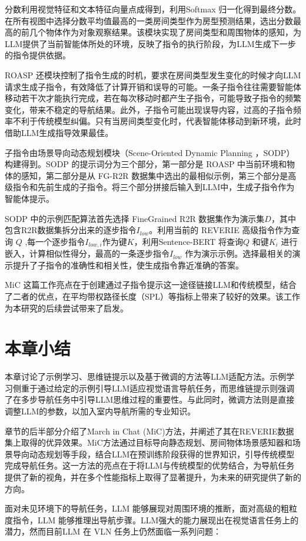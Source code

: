 \documentclass[bachelor]{thesis-uestc}
\begin{document}
分数利用视觉特征和文本特征向量点成得到，利用Softmax 归一化得到最终分数。在所有视图中选择分数平均值最高的一类房间类型作为房型预测结果，选出分数最高的前几个物体作为对象观察结果。该模块实现了房间类型和周围物体的感知，为LLM提供了当前智能体所处的环境，反映了指令的执行阶段，为LLM生成下一步的指令提供依据。

ROASP 还模块控制了指令生成的时机，要求在房间类型发生变化的时候才向LLM请求生成子指令，有效降低了计算开销和误导的可能。一条子指令往往需要智能体移动若干次才能执行完成，若在每次移动时都产生子指令，可能导致子指令的频繁变化，带来不稳定的导航结果。此外，子指令可能出现误导内容，过高的子指令频率不利于传统模型纠偏。只有当房间类型变化时，代表智能体移动到新环境，此时借助LLM生成指导效果最佳。

子指令由场景导向动态规划模块（Scene-Oriented Dynamic Planning ，SODP）构建得到。SODP 的提示词分为三个部分，第一部分是 ROASP 中当前环境和物体的感知，第二部分是从 FG-R2R 数据集中选出的最相似示例，第三个部分是高级指令和先前生成的子指令。将三个部分拼接后输入到LLM中，生成子指令作为智能体提示。

SODP 中的示例匹配算法首先选择 FineGrained R2R 数据集作为演示集$D$，其中包含R2R数据集拆分出来的逐步指令$I_{low}$。利用当前的 REVERIE 高级指令作为查询 $Q$ ,每一个逐步指令$I_{low,i}$作为键$K$，利用Sentence-BERT 将查询$Q$ 和键$K_i$ 进行嵌入，计算相似性得分，最高的一条逐步指令$I_{low}$ 作为演示示例。选择最相关的演示提升了子指令的准确性和相关性，使生成指令靠近准确的答案。

MiC 这篇工作亮点在于创建通过子指令提示这一途径链接LLM和传统模型，结合了二者的优点，在平均带权路径长度（SPL）等指标上带来了较好的效果。该工作为本研究的后续尝试带来了启发。

\section{本章小结}
本章讨论了示例学习、思维链提示以及基于微调的方法等LLM适配方法。示例学习侧重于通过给定的示例引导LLM适应视觉语言导航任务，而思维链提示则强调了在多步导航任务中引导LLM思维过程的重要性。与此同时，微调方法则是直接调整LLM的参数，以加入室内导航所需的专业知识。

章节的后半部分介绍了March in Chat (MiC)方法，并阐述了其在REVERIE数据集上取得的优异效果。MiC方法通过目标导向静态规划、房间物体场景感知器和场景导向动态规划等手段，结合LLM在预训练阶段获得的世界知识，引导传统模型完成导航任务。这一方法的亮点在于将LLM与传统模型的优势结合，为导航任务提供了新的视角，并在多个性能指标上取得了显著提升，为未来的研究提供了新的方向。

面对未见环境下的导航任务，LLM 能够展现对周围环境的推断，面对高级的粗粒度指令，LLM 能够推理出导航步骤。LLM强大的能力展现出在视觉语言任务上的潜力，然而目前LLM 在 VLN 任务上仍然面临一系列问题：
\end{document}
